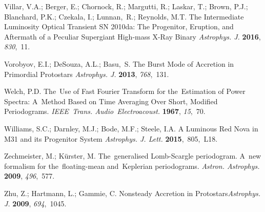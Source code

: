 \documentclass[galaxies,article,accept,moreauthors,pdftex]{mdpi}
\makeatletter
\let\jnl@style=\rmfamily
\def\ref@jnl#1{{\jnl@style#1}}%
\newcommand\apj{\ref@jnl{Astrophys. J.}}%
\newcommand\apjl{\ref@jnl{Astrophys. J. Lett.}}     %
\newcommand\aap{\ref@jnl{Astron. Astrophys.}}%
\makeatother
\begin{document}
\begin{thebibliography}{999}
Villar, V.A.; Berger, E.; Chornock, R.; Margutti, R.; Laskar, T.; Brown, P.J.; Blanchard, P.K.; Czekala, I.; Lunnan,~R.; Reynolds, M.T.  The Intermediate Luminosity Optical Transient SN 2010da: The Progenitor, Eruption, and Aftermath of a Peculiar Supergiant High-mass X-Ray Binary  {\em \apj}  \textbf{2016}, \emph{830},~11.

 
 Vorobyov, E.I.; DeSouza, A.L.; Basu,~S.  The Burst Mode of Accretion in Primordial Protostars {\em \apj} \textbf{2013}, \emph{768},~131.

 Welch, P.D. The~Use of Fast Fourier Transform for the~Estimation of Power Spectra: A~Method Based on Time Averaging Over Short, Modified Periodograms.
 {\em IEEE~Trans. Audio~Electroacoust.} \textbf{1967}, \emph{15},~70.


 Williams, S.C.; Darnley, M.J.; Bode, M.F.; Steele, I.A. A Luminous Red Nova in M31 and its Progenitor System  {\em \apjl} \textbf{2015},~805,~L18.


 Zechmeister, M.; K{\"u}rster, M. The~generalised Lomb-Scargle periodogram. A~new formalism for the~floating-mean and~Keplerian periodograms.  {\em \aap} \textbf{2009}, \emph{496},~577.


 Zhu, Z.; Hartmann, L.; Gammie, C. Nonsteady Accretion in Protostars{\em \apj} \textbf{2009}, \emph{694},~1045.
 



\end{thebibliography}

\end{document}
